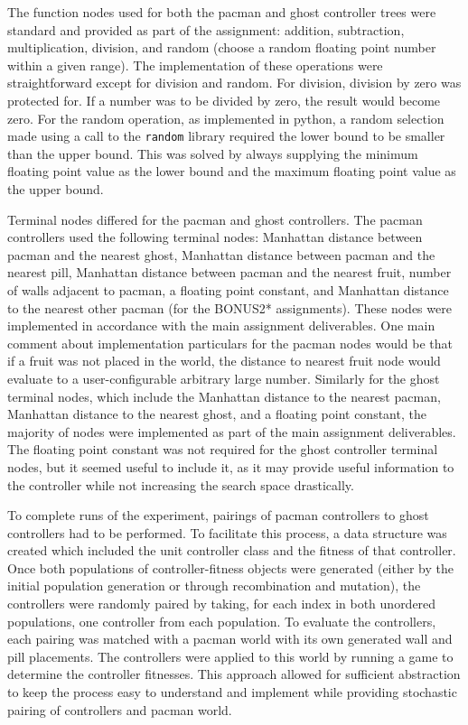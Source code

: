 \documentclass[11pt]{article}
\begin{document}
The function nodes used for both the pacman and ghost controller trees were standard and provided as part of the assignment: 
addition, subtraction, multiplication, division, and random (choose a random floating point number 
within a given range). The implementation of these operations were straightforward except for division and
random. For division, division by zero was protected for. If a number was to be divided by zero, the result
would become zero. For the random operation, as implemented in python, a random selection made using a call
to the \texttt{random} library required the lower bound to be smaller than the upper bound. This was solved
by always supplying the minimum floating point value as the lower bound and the maximum floating point value
as the upper bound.

Terminal nodes differed for the pacman and ghost controllers. The pacman controllers used the following terminal nodes: 
Manhattan distance between pacman and the nearest ghost, Manhattan distance between pacman and the nearest pill, Manhattan
distance between pacman and the nearest fruit, number of walls adjacent to pacman, a floating point constant, and Manhattan
distance to the nearest other pacman (for the BONUS2* assignments). These nodes were implemented in accordance with the 
main assignment deliverables. One main comment about implementation particulars for the pacman nodes would be that if a fruit
was not placed in the world, the distance to nearest fruit node would evaluate to a user-configurable arbitrary large number.
Similarly for the ghost terminal nodes, which include the Manhattan distance to the nearest pacman, Manhattan distance to
the nearest ghost, and a floating point constant, the majority of nodes were implemented as part of the main assignment deliverables.
The floating point constant was not required for the ghost controller terminal nodes, but it seemed useful to include it, 
as it may provide useful information to the controller while not increasing the search space drastically.

To complete runs of the experiment, pairings of pacman controllers to ghost controllers had to be performed. To facilitate this
process, a data structure was created which included the unit controller class and the fitness of that controller. Once both
populations of controller-fitness objects were generated (either by the initial population generation or through recombination and mutation), the controllers
were randomly paired by taking, for each index in both unordered populations, one controller from each population. To evaluate
the controllers, each pairing was matched with a pacman world with its own generated wall and pill placements. The controllers were applied
to this world by running a game to determine the controller fitnesses. This approach allowed for sufficient abstraction to keep 
the process easy to understand and implement while providing stochastic pairing of controllers and pacman world.
\end{document}
